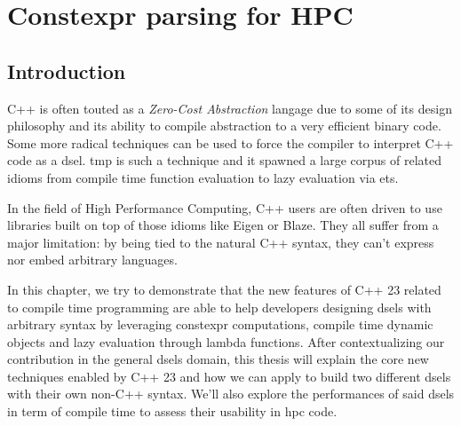 \documentclass[english,12pt,a4paper]{book}
\providecommand{\cpp}{\textsc{C++}\xspace}
\begin{document}
\chapter{
  Constexpr parsing for HPC
}

\section{Introduction}


\cpp is often touted as a \textit{Zero-Cost Abstraction} langage due to some of
its design philosophy and its ability to compile abstraction to a very efficient
binary code. Some more radical techniques can be used to force the compiler to
interpret \cpp code as a \gls{dsel}. \Gls{tmp} is such a technique
and it spawned a large corpus of related idioms from compile time function
evaluation to lazy evaluation via \glspl{et}.

In the field of High Performance Computing, \cpp users are often driven to use
libraries built on top of those idioms like Eigen\cite{eigen} or
Blaze\cite{blazelib,iglberger2012_2}. They all suffer from a major limitation:
by being tied to the natural \cpp syntax, they can't express nor embed arbitrary
languages.

In this chapter, we try to demonstrate that the new features of \cpp23 related to
compile time programming are able to help developers designing \glspl{dsel} with
arbitrary syntax by leveraging \gls{constexpr} computations, compile time dynamic
objects and lazy evaluation through lambda functions. After contextualizing our
contribution in the general \glspl{dsel} domain, this thesis will explain the core
new techniques enabled by \cpp23 and how we can apply to build two different
\glspl{dsel} with their own non-\cpp syntax. We'll also explore the performances of
said \glspl{dsel} in term of compile time to assess their usability in \gls{hpc} code.
\end{document}
